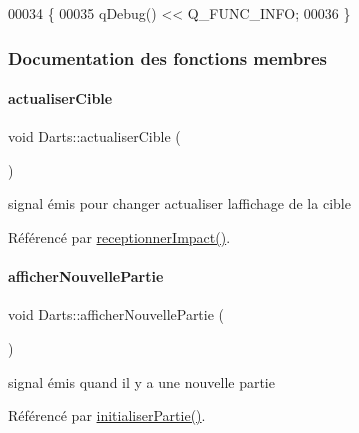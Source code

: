 \begin{DoxyCode}
00034 \{
00035     qDebug() << Q\_FUNC\_INFO;
00036 \}
\end{DoxyCode}


\subsubsection{Documentation des fonctions membres}
\mbox{\label{class_darts_afcf6c21d8489e9cf1734458a23b518eb}} 
\paragraph{\texorpdfstring{actualiser\+Cible}{actualiserCible}}
{\footnotesize\ttfamily void Darts\+::actualiser\+Cible (\begin{DoxyParamCaption}{ }\end{DoxyParamCaption})\hspace{0.3cm}{\ttfamily [signal]}}



signal émis pour changer actualiser l\textquotesingle{}affichage de la cible 



Référencé par \hyperlink{darts_8cpp_source_l00223}{receptionner\+Impact()}.

\mbox{\label{class_darts_a650d6efdef25756bfbbacb0bb3549c43}} 
\paragraph{\texorpdfstring{afficher\+Nouvelle\+Partie}{afficherNouvellePartie}}
{\footnotesize\ttfamily void Darts\+::afficher\+Nouvelle\+Partie (\begin{DoxyParamCaption}{ }\end{DoxyParamCaption})\hspace{0.3cm}{\ttfamily [signal]}}



signal émis quand il y a une nouvelle partie 



Référencé par \hyperlink{darts_8cpp_source_l00144}{initialiser\+Partie()}.

